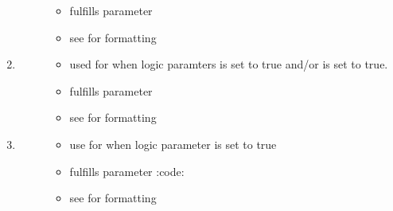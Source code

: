 \documentclass[letterpaper,10pt,english]{sphinxmanual}
\begin{document}
\begin{enumerate}
\begin{description}
\begin{itemize}
\item {} 
fulfills parameter 

\item {} 
see {\hyperref[\detokenize{fileFormats:chromosome-length-file-format}]{}} for formatting

\end{itemize}

\end{description}

\item {} \begin{description}
\item[{}] \leavevmode\begin{itemize}
\item {} 
used for when logic paramters  is set to true and/or  is set to true.

\item {} 
fulfills parameter 

\item {} 
see {\hyperref[\detokenize{fileFormats:imputation-name-format}]{}} for formatting

\end{itemize}

\end{description}

\item {} \begin{description}
\item[{}] \leavevmode\begin{itemize}
\item {} 
use for when logic parameter  is set to true

\item {} 
fulfills parameter :code: 

\item {} 
see {\hyperref[\detokenize{fileFormats:info-file-format}]{}} for formatting

\end{itemize}

\end{description}

\end{enumerate}
\end{document}
